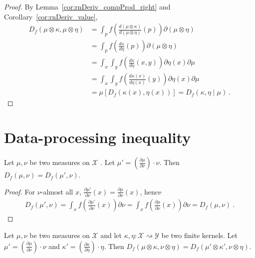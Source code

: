 \begin{proof}
By Lemma~\ref{cor:rnDeriv_compProd_right} and Corollary~\ref{cor:rnDeriv_value},
\begin{align*}
D_f(\mu \otimes \kappa, \mu \otimes \eta)
&= \int_{p} f\left(\frac{d (\mu \otimes \kappa)}{d (\mu \otimes \eta)}(p)\right) \partial(\mu \otimes \eta)
\\
&= \int_{p} f\left(\frac{d \kappa}{d \eta}(p)\right) \partial(\mu \otimes \eta)
\\
&= \int_x \int_y f\left(\frac{d \kappa}{d \eta}(x, y)\right) \partial \eta(x) \partial \mu
\\
&= \int_x \int_y f\left(\frac{d \kappa(x)}{d \eta(x)}(y)\right) \partial \eta(x) \partial \mu
\\
&= \mu\left[D_f(\kappa(x), \eta(x))\right]
= D_f(\kappa, \eta \mid \mu)
\: .
\end{align*}
\end{proof}

\section{Data-processing inequality}

\begin{lemma}
  \label{lem:fDiv_eq_ac}
  Let $\mu, \nu$ be two measures on $\mathcal X$ . Let $\mu' = \left(\frac{\partial \mu}{\partial \nu}\right) \cdot \nu$.
  Then $D_f(\mu, \nu) = D_f(\mu', \nu)$.
\end{lemma}

\begin{proof}
For $\nu$-almost all $x$, $\frac{\partial \mu'}{\partial \nu}(x) = \frac{\partial \mu}{\partial \nu}(x)$, hence
\begin{align*}
D_f(\mu', \nu)
= \int_x f\left(\frac{\partial \mu'}{\partial \nu}(x)\right)\partial \nu
= \int_x f\left(\frac{\partial \mu}{\partial \nu}(x)\right)\partial \nu
= D_f(\mu, \nu)
\: .
\end{align*}

\end{proof}

\begin{lemma}
  \label{lem:fDiv_compProd_eq_ac}
  Let $\mu, \nu$ be two measures on $\mathcal X$ and let $\kappa, \eta : \mathcal X \rightsquigarrow \mathcal Y$ be two finite kernels. Let $\mu' = \left(\frac{\partial \mu}{\partial \nu}\right) \cdot \nu$ and $\kappa' = \left(\frac{\partial \kappa}{\partial \eta}\right) \cdot \eta$.
  Then $D_f(\mu \otimes \kappa, \nu \otimes \eta) = D_f(\mu' \otimes \kappa', \nu \otimes \eta)$.
\end{lemma}

